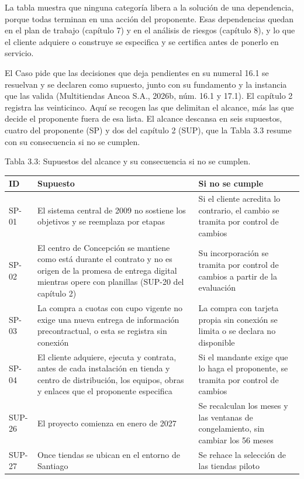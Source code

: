 \documentclass[11pt]{article}
\begin{document}
La tabla muestra que ninguna categoría libera a la solución de una dependencia, porque todas terminan en una acción del proponente. Esas dependencias quedan en el plan de trabajo (capítulo 7) y en el análisis de riesgos (capítulo 8), y lo que el cliente adquiere o construye se especifica y se certifica antes de ponerlo en servicio.

El Caso pide que las decisiones que deja pendientes en su numeral 16.1 se resuelvan y se declaren como supuesto, junto con su fundamento y la instancia que las valida (Multitiendas Ancoa S.A., 2026b, núm. 16.1 y 17.1). El capítulo 2 registra las veinticinco. Aquí se recogen las que delimitan el alcance, más las que decide el proponente fuera de esa lista. El alcance descansa en seis supuestos, cuatro del proponente (SP) y dos del capítulo 2 (SUP), que la Tabla 3.3 resume con su consecuencia si no se cumplen.

Tabla 3.3: Supuestos del alcance y su consecuencia si no se cumplen.

\begin{longtable}[]{@{}
  >{\raggedright\arraybackslash}p{}
  >{\raggedright\arraybackslash}p{}
  >{\raggedright\arraybackslash}p{}@{}}
\toprule\noalign{}
ID & Supuesto & Si no se cumple \\
\midrule\noalign{}
\endhead
\bottomrule\noalign{}
\endlastfoot
SP-01 & El sistema central de 2009 no sostiene los objetivos y se reemplaza por etapas & Si el cliente acredita lo contrario, el cambio se tramita por control de cambios \\
SP-02 & El centro de Concepción se mantiene como está durante el contrato y no es origen de la promesa de entrega digital mientras opere con planillas (SUP-20 del capítulo 2) & Su incorporación se tramita por control de cambios a partir de la evaluación \\
SP-03 & La compra a cuotas con cupo vigente no exige una nueva entrega de información precontractual, o esta se registra sin conexión & La compra con tarjeta propia sin conexión se limita o se declara no disponible \\
SP-04 & El cliente adquiere, ejecuta y contrata, antes de cada instalación en tienda y centro de distribución, los equipos, obras y enlaces que el proponente especifica & Si el mandante exige que lo haga el proponente, se tramita por control de cambios \\
SUP-26 & El proyecto comienza en enero de 2027 & Se recalculan los meses y las ventanas de congelamiento, sin cambiar los 56 meses \\
SUP-27 & Once tiendas se ubican en el entorno de Santiago & Se rehace la selección de las tiendas piloto \\
\end{longtable}
\end{document}
